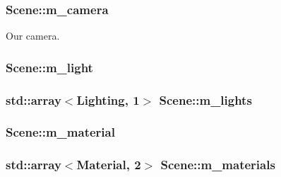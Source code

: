 \subsubsection[{\texorpdfstring{m\+\_\+camera}{m_camera}}]{ Scene\+::m\+\_\+camera\hspace{0.3cm}{\ttfamily [private]}}\hypertarget{class_scene_a1b706ed302145fe191131cefe8873fec}{}\label{class_scene_a1b706ed302145fe191131cefe8873fec}
Our camera. 
\subsubsection[{\texorpdfstring{m\+\_\+light}{m_light}}]{ Scene\+::m\+\_\+light\hspace{0.3cm}{\ttfamily [private]}}\hypertarget{class_scene_af2eaac7f7e7997e0b2a47373f55cb2e1}{}\label{class_scene_af2eaac7f7e7997e0b2a47373f55cb2e1}
\subsubsection[{\texorpdfstring{m\+\_\+lights}{m_lights}}]{\setlength{\rightskip}{0pt plus 5cm}std\+::array$<${\bf Lighting}, 1$>$ Scene\+::m\+\_\+lights\hspace{0.3cm}{\ttfamily [private]}}\hypertarget{class_scene_adb68e0b4186fa78d472880f259e49671}{}\label{class_scene_adb68e0b4186fa78d472880f259e49671}
\subsubsection[{\texorpdfstring{m\+\_\+material}{m_material}}]{ Scene\+::m\+\_\+material\hspace{0.3cm}{\ttfamily [private]}}\hypertarget{class_scene_a80eed5a8d1800f3b426bca2eda26d4b6}{}\label{class_scene_a80eed5a8d1800f3b426bca2eda26d4b6}
\subsubsection[{\texorpdfstring{m\+\_\+materials}{m_materials}}]{\setlength{\rightskip}{0pt plus 5cm}std\+::array$<${\bf Material}, 2$>$ Scene\+::m\+\_\+materials\hspace{0.3cm}{\ttfamily [private]}}\hypertarget{class_scene_af5fcdd7b94d1669008bd13d7ecde01c1}{}\label{class_scene_af5fcdd7b94d1669008bd13d7ecde01c1}

